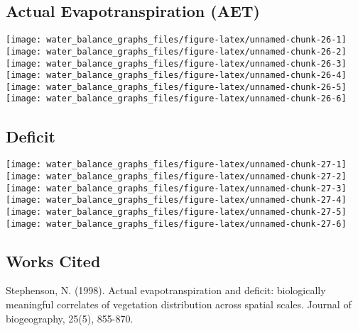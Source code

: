 \documentclass[
]{article}
\begin{document}
\hypertarget{actual-evapotranspiration-aet}{%
\subsection{Actual Evapotranspiration
(AET)}\label{actual-evapotranspiration-aet}}

\texttt{[image: water\_balance\_graphs\_files/figure-latex/unnamed-chunk-26-1]}
\texttt{[image: water\_balance\_graphs\_files/figure-latex/unnamed-chunk-26-2]}
\texttt{[image: water\_balance\_graphs\_files/figure-latex/unnamed-chunk-26-3]}
\texttt{[image: water\_balance\_graphs\_files/figure-latex/unnamed-chunk-26-4]}
\texttt{[image: water\_balance\_graphs\_files/figure-latex/unnamed-chunk-26-5]}
\texttt{[image: water\_balance\_graphs\_files/figure-latex/unnamed-chunk-26-6]}

\hypertarget{deficit}{%
\subsection{Deficit}\label{deficit}}

\texttt{[image: water\_balance\_graphs\_files/figure-latex/unnamed-chunk-27-1]}
\texttt{[image: water\_balance\_graphs\_files/figure-latex/unnamed-chunk-27-2]}
\texttt{[image: water\_balance\_graphs\_files/figure-latex/unnamed-chunk-27-3]}
\texttt{[image: water\_balance\_graphs\_files/figure-latex/unnamed-chunk-27-4]}
\texttt{[image: water\_balance\_graphs\_files/figure-latex/unnamed-chunk-27-5]}
\texttt{[image: water\_balance\_graphs\_files/figure-latex/unnamed-chunk-27-6]}

\hypertarget{works-cited}{%
\subsection{Works Cited}\label{works-cited}}

Stephenson, N. (1998). Actual evapotranspiration and deficit:
biologically meaningful correlates of vegetation distribution across
spatial scales. Journal of biogeography, 25(5), 855-870.
\end{document}
